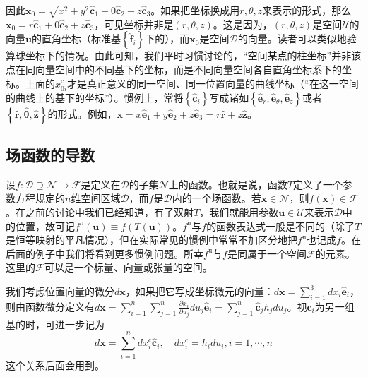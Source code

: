 \documentclass[main.tex]{subfiles}
\begin{document}
\begin{example}[柱坐标]
    因此$\mathbf{x}_0=\sqrt{x^2+y^2}\mathbf{\hat{c}}_1+0\mathbf{\hat{c}}_2+z\mathbf{\hat{c}}_3$。如果把坐标换成用$r,\theta,z$来表示的形式，那么$\mathbf{x}_0=r\mathbf{\hat{c}}_1+0\mathbf{\hat{c}}_2+z\mathbf{\hat{c}}_3$，可见坐标并非是$\left(r,\theta,z\right)$。这是因为，$\left(r,\theta,z\right)$是空间$\mathcal{U}$的向量$\mathbf{u}$的直角坐标（标准基$\left\{\mathbf{\hat{f}}_i\right\}$下的），而$\mathbf{x}_0$是空间$\mathcal{D}$的向量。读者可以类似地验算球坐标下的情况。由此可知，我们平时习惯讨论的，“空间某点的柱坐标”并非该点在同向量空间中的不同基下的坐标，而是不同向量空间各自直角坐标系下的坐标。上面的$x_{0i}^\mathrm{c}$才是真正意义的同一空间、同一位置向量的曲线坐标（“在这一空间的曲线上的基下的坐标”）。惯例上，常将$\left\{\mathbf{\hat{c}}_i\right\}$写成诸如$\left\{\mathbf{\hat{e}}_r,\mathbf{\hat{e}}_\theta,\mathbf{\hat{e}}_z\right\}$或者$\left\{\mathbf{\hat{r}},\hat{\boldsymbol{\theta}},\mathbf{\hat{z}}\right\}$的形式。例如，$\mathbf{x}=x\mathbf{\hat{e}}_1+y\mathbf{\hat{e}}_2+z\mathbf{\hat{e}}_3=r\mathbf{\hat{r}}+z\mathbf{\hat{z}}$。
\end{example}

\subsection{场函数的导数}
设$f:\mathcal{D}\supseteq\mathcal{N}\rightarrow\mathcal{F}$是定义在$\mathcal{D}$的子集$\mathcal{N}$上的函数。也就是说，函数$T$定义了一个参数方程规定的$n$维空间区域$\mathcal{D}$，而$f$是$\mathcal{D}$内的一个场函数。若$\mathbf{x}\in\mathcal{N}$，则$f\left(\mathbf{x}\right)\in\mathcal{F}$。在之前的讨论中我们已经知道，有了双射$T$，我们就能用参数$\mathbf{u}\in\mathcal{U}$来表示$\mathcal{D}$中的位置，故可记$f^\mathrm{u}\left(\mathbf{u}\right)\equiv f\left(T\left(\mathbf{u}\right)\right)$。$f^\mathrm{u}$与$f$的函数表达式一般是不同的（除了$T$是恒等映射的平凡情况），但在实际常见的惯例中常常不加区分地把$f^\mathrm{u}$也记成$f$。在后面的例子中我们将看到更多惯例问题。所幸$f^\mathrm{u}$与$f$是同属于一个空间$\mathcal{F}$的元素。这里的$\mathcal{F}$可以是一个标量、向量或张量的空间。

我们考虑位置向量的微分$d\mathbf{x}$，如果把它写成坐标微元的向量：$d\mathbf{x}=\sum_{i=1}^3dx_i\mathbf{\hat{e}}_i$，则由函数微分定义有$d\mathbf{x}=\sum_{i=1}^n\sum_{j=1}^n\frac{\partial x_i}{\partial u_j}du_j\mathbf{\hat{e}}_i=\sum_{j=1}^n\mathbf{\hat{c}}_jh_jdu_j$。视$\mathbf{\hat{c}}_i$为另一组基的时，可进一步记为
\[d\mathbf{x}=\sum_{i=1}^ndx_i^\mathrm{c}\mathbf{\hat{c}}_i,\quad dx_i^\mathrm{c}=h_idu_i,i=1,\cdots,n\]
这个关系后面会用到。
\end{document}
